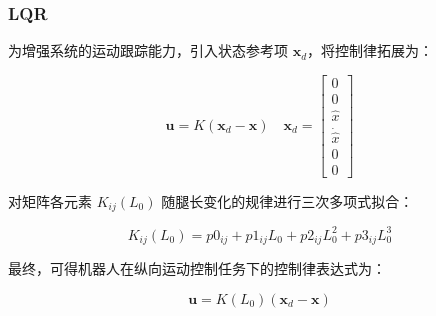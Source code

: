 \documentclass{beamer}
\begin{document}
	\begin{frame}
	\frametitle{LQR}
	为增强系统的运动跟踪能力，引入状态参考项 $\mathbf{x}_d$，将控制律拓展为：
	
	\[
	\mathbf{u} = K (\mathbf{x}_d - \mathbf{x}) 	\quad
	\mathbf{x}_d =
	\begin{bmatrix}
		0 \\
		0 \\
		\hat{x} \\
		\dot{\hat{x}} \\
		0 \\
		0
	\end{bmatrix}
	\]
	
	

	
	对矩阵各元素 $K_{ij}(L_0)$ 随腿长变化的规律进行三次多项式拟合：
	
	\[
	K_{ij}(L_0) = p0_{ij} + p1_{ij} L_0 + p2_{ij} L_0^2 + p3_{ij} L_0^3
	\]
	
	最终，可得机器人在纵向运动控制任务下的控制律表达式为：
	
	\[
	\mathbf{u} = K(L_0) \left( \mathbf{x}_d - \mathbf{x} \right)
	\]
	
	\end{frame}
	
\end{document}

